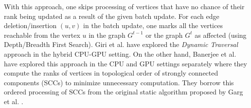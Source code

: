 With this approach, one skips processing of vertices that have no chance of their rank being updated as a result of the given batch update. For each edge deletion/insertion $(u, v)$ in the batch update, one marks all the vertices reachable from the vertex $u$ in the graph $G^{t-1}$ or the graph $G^t$ as affected (using Depth/Breadth First Search). Giri et al. \cite{rank-giri20} have explored the \textit{Dynamic Traversal} approach in the hybrid CPU-GPU setting. On the other hand, Banerjee et al. \cite{rank-sahu22} have explored this approach in the CPU and GPU settings separately where they compute the ranks of vertices in topological order of strongly connected components (SCCs) to minimize unnecessary computation. They borrow this ordered processing of SCCs from the original static algorithm proposed by Garg et al. \cite{rank-garg16}.




